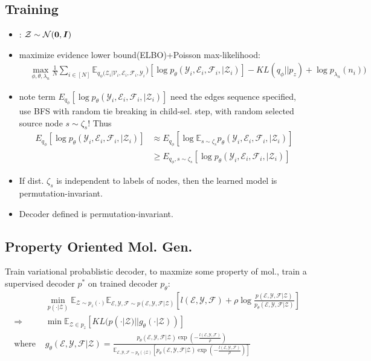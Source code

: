 \documentclass{article}
\begin{document}
    \subsection{Training}
    \begin{itemize}
        \item {}: $\mathcal Z\sim \mathcal N(\boldsymbol{0}, \boldsymbol{I})$
        \item maximize evidence lower bound(ELBO)+Poisson max-likelihood:
        \begin{align}
            &\max_{\phi, \theta, \lambda_n} \frac 1 N \sum_{i\in[N]} \mathbb E_{q_\phi(\mathcal Z_i|\mathcal V_i, \mathcal E_i, \mathcal F_i, \mathcal Y_i})[\log p_\theta(\mathcal Y_i, \mathcal E_i, \mathcal F_i, |\mathcal Z_i)] - KL(q_\phi||p_z) + \log p_{\lambda_n}(n_i))
        \end{align}
        \item note term $E_{q_\phi}[\log p_\theta(\mathcal Y_i, \mathcal E_i, \mathcal F_i, |\mathcal Z_i)]$ need the edges sequence specified, use BFS with random tie breaking in child-sel. step, with random selected source node $s\sim \zeta_s$! Thus 
        \begin{align}
            E_{q_\phi}[\log p_\theta(\mathcal Y_i, \mathcal E_i, \mathcal F_i, |\mathcal Z_i)]
            &\approx E_{q_\phi}[\log \mathbb E_{s\sim \zeta_s} p_\theta(\mathcal Y_i, \mathcal E_i, \mathcal F_i, |\mathcal Z_i)] \\
            &\ge E_{q_\phi, s\sim \zeta_s}[ \log p_\theta(\mathcal Y_i, \mathcal E_i, \mathcal F_i, |\mathcal Z_i)]
        \end{align}
        \item {} If dist. $\zeta_s$ is independent to labels of nodes, then the learned model is permutation-invariant.
        \item {} Decoder defined is permutation-invariant.
    \end{itemize}

\subsection{Property Oriented Mol. Gen.}
    Train variational probablistic decoder, to maxmize some property of mol., \trarr train a supervised decoder $p^*$ on trained decoder $p_\theta$:
    \begin{align}
        & \min_{p(\cdot|\mathcal Z)} \mathbb E_{\mathcal Z\sim p_z(\cdot)}\mathbb E_{\mathcal{E,Y,F}\sim p(\mathcal{E,Y,F}|\mathcal Z)}[l(\mathcal{E,Y,F})+\rho \log \frac{p(\mathcal{E,Y,F}|\mathcal Z)}{p_\theta (\mathcal{E,Y,F}|\mathcal Z)}]\\
        \Rightarrow &\min \mathbb E_{\mathcal Z\in p_z}[KL(p(\cdot|\mathcal Z)||g_\theta(\cdot|\mathcal Z))]\\
        \text{where } &g_\theta(\mathcal{E,Y,F}|\mathcal Z)=\frac{p_\theta(\mathcal{E,Y,F}|\mathcal Z)\exp(-\frac{l(\mathcal{E,Y,F})}{\rho})}{\mathbb E_{\mathcal{E,Y,F}\sim p_\theta(\cdot|\mathcal Z)} [p_\theta(\mathcal{E,Y,F}|\mathcal Z)\exp(-\frac{l(\mathcal{E,Y,F})}{\rho})]}
    \end{align}
\end{document}
